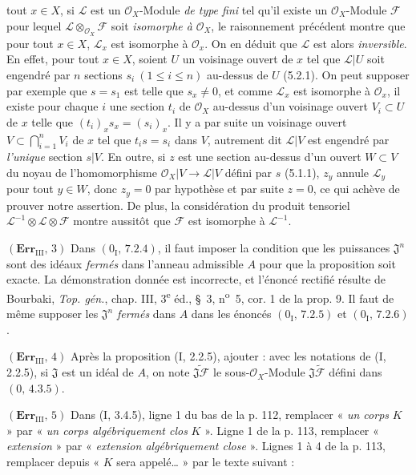 tout $x\in X$, si $\mathscr L$ est un $\mathscr O_X$-Module \emph{de type fini}
tel qu'il existe un $\mathscr O_X$-Module $\mathscr F$ pour lequel
$\mathscr L\otimes_{\mathscr O_X}\mathscr F$ soit \emph{isomorphe à}
$\mathscr O_X$, le raisonnement précédent montre que pour tout $x\in X$,
$\mathscr L_x$ est isomorphe à $\mathscr O_x$. On en déduit que $\mathscr L$ est
alors \emph{inversible}. En effet, pour tout $x\in X$, soient $U$ un voisinage
ouvert de $x$ tel que $\mathscr L|U$ soit engendré par $n$ sections
$s_i\ (1\leq i\leq n)$ au-dessus de $U$ (5.2.1). On peut supposer par exemple
que $s=s_1$ est telle que $s_x\ne0$, et comme $\mathscr L_x$ est isomorphe à
$\mathscr O_x$, il existe pour chaque $i$ une section $t_i$ de $\mathscr O_X$
au-dessus d'un voisinage ouvert $V_i\subset U$ de $x$ telle que
$(t_i)_x s_x=(s_i)_x$. Il y a par suite un voisinage ouvert
$V\subset\bigcap_{i=1}^nV_i$ de $x$ tel que $t_i s=s_i$ dans $V$, autrement
dit $\mathscr L|V$ est engendré par \emph{l'unique} section $s|V$. En outre,
si $z$ est une section au-dessus d'un ouvert $W\subset V$ du noyau de
l'homomorphisme $\mathscr O_X|V\to\mathscr L|V$ défini par $s$ (5.1.1), $z_y$
annule $\mathscr L_y$ pour tout $y\in W$, donc $z_y=0$ par hypothèse et par
suite $z=0$, ce qui achève de prouver notre assertion. De plus, la
considération du produit tensoriel
$\mathscr L^{-1}\otimes\mathscr L\otimes\mathscr F$ montre aussitôt que
$\mathscr F$ est isomorphe à $\mathscr L^{-1}$.

\noindent\textbf{$(\mathbf{Err}_{\mathrm{III}},\,3)$} Dans
$(0_{\mathrm I},\,7.2.4)$, il faut imposer la condition que les puissances
$\mathfrak J^n$ sont des idéaux \emph{fermés} dans l'anneau admissible $A$ pour
que la proposition soit exacte. La démonstration donnée est incorrecte, et
l'énoncé rectifié résulte de Bourbaki, \emph{Top. gén.}, chap. III,
3\textsuperscript{e} éd., \S~3, n\textsuperscript{o}~5, cor. 1 de la prop. 9.
Il faut de même supposer les $\mathfrak J^n$ \emph{fermés} dans $A$ dans les
énoncés $(0_{\mathrm I},\,7.2.5)$ et $(0_{\mathrm I},\,7.2.6)$.

\noindent\textbf{$(\mathbf{Err}_{\mathrm{III}},\,4)$} Après la proposition
(I, 2.2.5), ajouter : avec les notations de (I, 2.2.5), si $\mathfrak J$ est un
idéal de $A$, on note $\widetilde{\mathfrak J\mathscr F}$ le sous-$\mathscr O_X$-Module
$\mathfrak J\widetilde{\mathscr F}$ défini dans $(0,\,4.3.5)$.

\noindent\textbf{$(\mathbf{Err}_{\mathrm{III}},\,5)$} Dans (I, 3.4.5), ligne 1
du bas de la p. 112, remplacer « \emph{un corps} $K$ » par « \emph{un corps
algébriquement clos} $K$ ». Ligne 1 de la p. 113, remplacer « \emph{extension} »
par « \emph{extension algébriquement close} ». Lignes 1 à 4 de la p. 113,
remplacer depuis « $K$ sera appelé\ldots{} » par le texte suivant :

